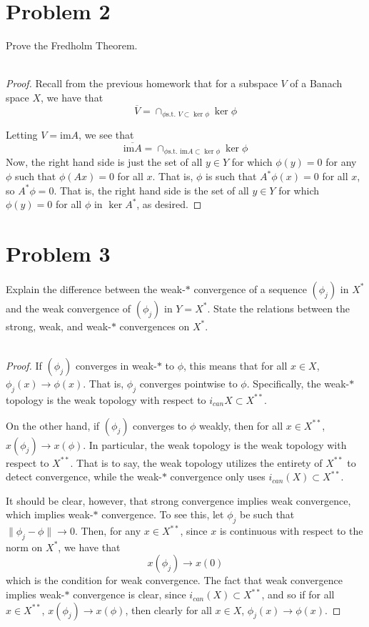 \documentclass[fontsize=11pt]{scrartcl} %
\numberwithin{equation}{section} %
\numberwithin{figure}{section} %
\numberwithin{table}{section} %
\newcommand{\im}{\textrm{im}}
\begin{document}
\section*{Problem 2}
Prove the Fredholm Theorem.
\\
\\
\begin{proof}
    Recall from the previous homework that for a subspace $V$ of a Banach space
    $X$, we have that
    \[
        \overline{V} = \cap_{\phi \text{s.t. } V\subset\ker\phi}\ker\phi
    \]

    Letting $V=\im A$, we see that
    \[
        \overline{\im A} = \cap_{\phi \text{s.t. } \im A\subset\ker\phi}\ker\phi
    \]
    Now, the right hand side is just the set of all $y\in Y$ for which
    $\phi(y)=0$ for any $\phi$ such that $\phi(Ax) = 0$ for all $x$. That is,
    $\phi$ is such that $A^*\phi(x) = 0$ for all $x$, so $A^*\phi = 0$. That is,
    the right hand side is the set of all $y\in Y$ for which $\phi(y) = 0$ for
    all $\phi$ in $\ker A^*$, as desired.
\end{proof}

\newpage

\section*{Problem 3}
Explain the difference between the weak-$*$ convergence of a sequence $(\phi_j)$ in
$X^*$ and the weak convergence of $(\phi_j)$ in $Y=X^*$. State the relations
between the strong, weak, and weak-$*$ convergences on $X^*$.
\\
\\
\begin{proof}
    If $(\phi_j)$ converges in weak-$*$ to $\phi$, this means that for all $x\in
    X$, $\phi_j(x) \to \phi(x)$. That is, $\phi_j$ converges pointwise to
    $\phi$. Specifically, the weak-$*$ topology is the weak topology with
    respect to $i_{can}X\subset X^{**}$.

    On the other hand, if $(\phi_j)$ converges to $\phi$ weakly, then for all
    $x\in X^{**}$, $x(\phi_j)\to x(\phi)$. In particular, the weak topology is
    the weak topology with respect to $X^{**}$. That is to say, the weak
    topology utilizes the entirety of $X^{**}$ to detect convergence, while the
    weak-$*$ convergence only uses $i_{can}(X)\subset X^{**}$.

    It should be clear, however, that strong convergence implies weak
    convergence, which implies weak-$*$ convergence. To see this, let $\phi_j$
    be such that $\|\phi_j-\phi\|\to 0$. Then, for any $x\in X^{**}$, since $x$
    is continuous with respect to the norm on $X^*$, we have that
    \[
        x(\phi_j)\to x(0)
    \]
    which is the condition for weak convergence. The fact that weak convergence
    implies weak-$*$ convergence is clear, since $i_{can}(X)\subset X^{**}$, and
    so if for all $x\in X^{**}$, $x(\phi_j)\to x(\phi)$, then clearly for all
    $x\in X$, $\phi_j(x)\to \phi(x)$.
\end{proof}
\end{document}
